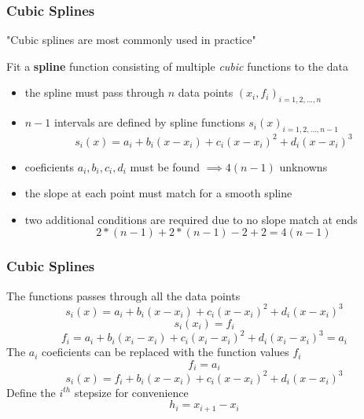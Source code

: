 \documentclass[fleqn]{beamer} %
\newcommand{\sectionIIIsubsectionIVtitle}{Cubic Splines}
\begin{document}
			\begin{frame}
				\frametitle{\sectionIIIsubsectionIVtitle}
				\bigskip
        
        "Cubic splines are most commonly used in practice" \vspcc
          
        Fit a {\bf spline} function consisting of multiple {\it cubic} functions to the data
       
        \begin{itemize}
          \item the spline must pass through $n$ data points $\left(x_i,f_i \right)_{i=1,2,...,n}$ 
          \item $n-1$ intervals are defined by spline functions $s_i(x)_{i=1,2,...,n-1}$
          \[s_i\left(x\right)=a_i+b_i\left(x-x_i\right)+c_i\left(x-x_i\right)^2+d_i\left(x-x_i\right)^3\]
          \item coeficients $a_i,b_i,c_i,d_i$ must be found $\implies 4\left(n-1\right)$ unknowns 
          \item the slope at each point must match for a smooth spline  
          \item two additional conditions are required due to no slope match at ends
          \[2*\left(n-1\right)+2*\left(n-1\right)-2+2=4\left(n-1\right)\]
       \end{itemize}            
 
				\btVFill
			\end{frame}	

			\begin{frame}
				\frametitle{\sectionIIIsubsectionIVtitle} \small
				\bigskip

        The functions passes through all the data points
        \[s_i\left(x\right)=a_i+b_i\left(x-x_i\right)+c_i\left(x-x_i\right)^2+d_i\left(x-x_i\right)^3\]
        \[s_i\left(x_i\right)=f_i\]       
        \[f_i=a_i+b_i\left(x_i-x_i\right)+c_i\left(x_i-x_i\right)^2+d_i\left(x_i-x_i\right)^3=a_i\]
        The $a_i$ coeficients can be replaced with the function values $f_i$
        \[f_i=a_i\]
        \[s_i\left(x\right)=f_i+b_i\left(x-x_i\right)+c_i\left(x-x_i\right)^2+d_i\left(x-x_i\right)^3\]
        Define the $i^{th}$ stepsize for convenience
        \[h_i=x_{i+1}-x_i\]
        \btVFill
			\end{frame}	
\end{document}

